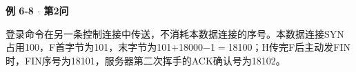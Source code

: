 {\color{ink}\bfseries 例 6-8 \(\cdot \) 第2问}\par\vspace{1bp}登录命令在另一条控制连接中传送，不消耗本数据连接的序号。本数据连接SYN占用100，F首字节为101，末字节为101\(+\allowbreak{}\)18000\(-\)1\(=\allowbreak{}\)18100；H传完F后主动发FIN时，FIN序号为18101，服务器第二次挥手的ACK确认号为18102。
